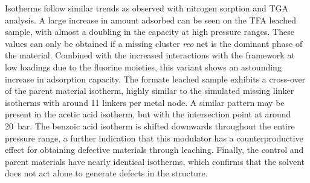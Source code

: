 Isotherms follow similar trends as observed with nitrogen sorption and
\gls{TGA} analysis. A large increase in amount adsorbed can be
seen on the \gls{TFA} leached sample, with almost a doubling in the 
capacity at high pressure ranges. These values can only be obtained 
if a missing cluster \textit{reo} net is the dominant phase of the 
material. Combined with the increased interactions with the framework
at low loadings due to the fluorine moieties, this variant shows an
astounding increase in adsorption capacity.
The formate leached sample exhibits a cross-over of the parent 
material isotherm, highly similar to the simulated missing linker isotherms 
with around 11 linkers per metal node. A similar pattern may be 
present in the acetic acid isotherm, but with the intersection point
at around \SI{20}{\bar}. The benzoic acid isotherm
is shifted downwards throughout the entire pressure range, a further
indication that this modulator has a counterproductive effect for
obtaining defective materials through leaching.
Finally, the control and parent materials have nearly identical isotherms,
which confirms that the solvent does not act alone to generate 
defects in the structure.
